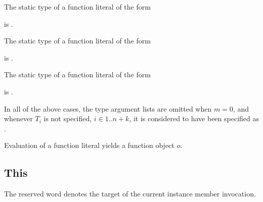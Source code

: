 \documentclass[makeidx]{article}
\begin{document}
{\LMHash{}%
The static type of a function literal of the form

\noindent
\code{<\TypeParametersStd>}

\noindent
{}

\noindent
is
.
\EndCase

\LMHash{}%
The static type of a function literal of the form

\noindent
\code{<\TypeParametersStd>}

\noindent
{}

\noindent
is
.
\EndCase

\LMHash{}%
The static type of a function literal of the form

\noindent
\code{<\TypeParametersStd>}

\noindent
{}

\noindent
is
.
\EndCase

\LMHash{}%
In all of the above cases,
the type argument lists are omitted when $m=0$,
and whenever $T_i$ is not specified, $i \in 1 .. n+k$,
it is considered to have been specified as \DYNAMIC.

\LMHash{}%
Evaluation of a function literal yields a function object $o$.



\subsection{This}

\LMHash{}%
The reserved word \THIS{} denotes
the target of the current instance member invocation.

}
\end{document}
